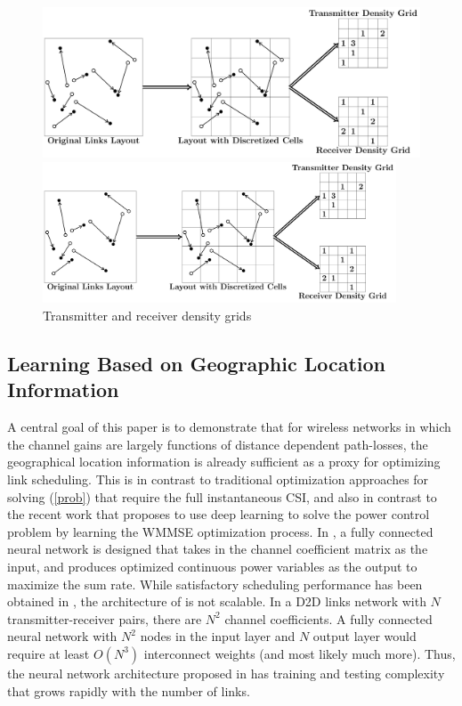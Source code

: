 \documentclass[journal,12pt,onecolumn,draftclsnofoot,]{IEEEtran}
\begin{document}
\begin{figure}
        \centering
        \ifOneColumn
            \centerline{\includegraphics[width=13cm]{fig/GridExplain}}
        \else
            \centerline{\includegraphics[width=10.5cm]{fig/GridExplain}}
        \fi
        \caption{Transmitter and receiver density grids}
        \label{fig:gridexplain}
\end{figure}

\subsection{Learning Based on Geographic Location Information}

A central goal of this paper is to demonstrate that for wireless networks 
in which the channel gains are largely functions of distance dependent path-losses,
the geographical location information is already sufficient as a proxy for
optimizing link scheduling.  This is in contrast to traditional optimization
approaches for solving (\ref{prob}) that require the full instantaneous CSI, 
and also in contrast to the recent work \cite{hong_spawc}
that proposes to use deep learning to solve the power control problem by
learning the WMMSE optimization process. In \cite{hong_spawc}, a fully
connected neural network is designed that
takes in the channel coefficient matrix as the input, and produces optimized
continuous power variables as the output to maximize the sum rate.
While satisfactory scheduling performance has been obtained in \cite{hong_spawc},
the architecture of \cite{hong_spawc} is not scalable. In a D2D links network
with $N$ transmitter-receiver pairs, there are $N^2$ channel coefficients. A
fully connected neural network with $N^2$ nodes in the input layer and $N$
output layer would require at least $O(N^3)$ interconnect weights (and most
likely much more). Thus, the neural network architecture proposed in
\cite{hong_spawc} has training and testing complexity that grows rapidly with
the number of links.
\end{document}
